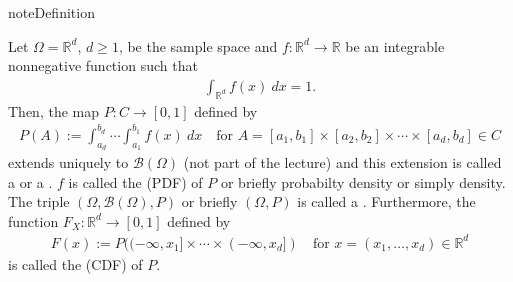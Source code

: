 \documentclass[letterpaper,10pt,english]{jupyterBook}
\begin{document}
\begin{sphinxadmonition}{note}{Definition}

\sphinxAtStartPar
Let \(\Omega = \mathbb{R}^d\), \(d \ge 1\), be the sample space and \(f: \mathbb{R}^d \rightarrow \mathbb{R}\) be an integrable non\sphinxhyphen{}negative function such that
\begin{equation*}
\begin{split} \int_{\mathbb{R}^d} f(x)~dx = 1. \end{split}
\end{equation*}
\sphinxAtStartPar
Then, the map \(P: C \rightarrow [0, 1]\) defined by
\begin{equation*}
\begin{split} P(A) := \int_{a_d}^{b_d} \cdots \int_{a_1}^{b_1} f(x) ~ dx \quad \text{for } A = [a_1, b_1] \times [a_2, b_2] \times \cdots \times [a_d, b_d] \in C\end{split}
\end{equation*}
\sphinxAtStartPar
extends uniquely to \(\mathcal{B}(\Omega)\) (not part of the lecture) and this extension is called a  or a . \(f\) is called the  (PDF) of \(P\) or briefly probabilty density or simply density. The triple \((\Omega, \mathcal{B}(\Omega), P)\) or briefly \((\Omega, P)\) is called a . Furthermore, the function \(F_X: \mathbb{R}^d \rightarrow [0, 1]\) defined by
\begin{equation*}
\begin{split} F(x) := P((-\infty, x_1] \times \cdots \times (-\infty, x_d]) \quad \text{for } x=(x_1, \dots, x_d) \in \mathbb{R}^d\end{split}
\end{equation*}
\sphinxAtStartPar
is called the  (CDF) of \(P\).
\end{sphinxadmonition}
\end{document}
